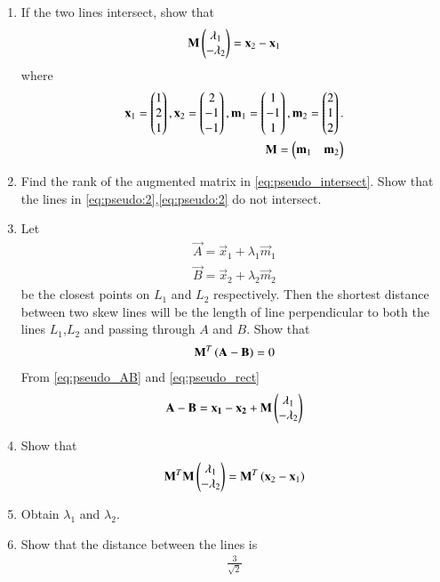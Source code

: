 \documentclass[journal,12pt,twocolumn]{IEEEtran}
\renewcommand\thesection{\arabic{section}}
\begin{document}
\begin{enumerate}[label=\thesection.\arabic*.,ref=\thesection.\theenumi]

\item If the two lines intersect, show that 
\begin{align}
\mathbf{M}\begin{pmatrix}\lambda_1 \\ -\lambda_2\end{pmatrix} = \mathbf{x}_2 - \mathbf{x}_1
\label{eq:pseudo_intersect}
\end{align}
%
where 
\begin{align}
\label{eq:pseudo_xm}
\mathbf{x}_1 = \begin{pmatrix}1\\2\\1\end{pmatrix},
\mathbf{x}_2 = \begin{pmatrix}2\\-1\\-1\end{pmatrix},
\mathbf{m}_1 = \begin{pmatrix}1\\-1\\1\end{pmatrix},
\mathbf{m}_2 = \begin{pmatrix}2\\1\\2\end{pmatrix}.
\\
\mathbf{M} =\begin{pmatrix}\mathbf{m}_1 & \mathbf{m}_2\end{pmatrix}
\label{eq:pseudo_rect}
\end{align}
\item Find the rank of the augmented matrix in 
\eqref{eq:pseudo_intersect}.
	Show that  the lines in \eqref{eq:pseudo:2},\eqref{eq:pseudo:2}
 do not intersect.
\item Let 
\begin{align}
\vec{A}=\vec{x}_1 + \lambda_1 \vec{m}_1
\\
\vec{B}=\vec{x}_2 + \lambda_2 \vec{m}_2
\label{eq:pseudo_AB}
\end{align}
be the closest points on $L_1$ and $L_2$ respectively.  Then the shortest distance between two skew lines 
will be the length of line perpendicular to both the lines $L_1$,$L_2$ and passing through $A$ and $B$.
Show that 
\begin{align}
\mathbf{M}^T\left(\mathbf{A}-\mathbf{B}\right) = 0
\label{eq:pseudo:MAB}
\end{align}
From \eqref{eq:pseudo_AB} and \eqref{eq:pseudo_rect}
%
\begin{align}
    \mathbf{A-B}=\mathbf{x_1-x_2}+\mathbf{M}\begin{pmatrix}\lambda_1\\ -\lambda_2\end{pmatrix}
\label{eq:pseudo:31}
\end{align}
\item Show that
\begin{align}
    \mathbf{M}^T\mathbf{M}\begin{pmatrix}\lambda_1\\-\lambda_2\end{pmatrix} = \mathbf{M}^T\left(\mathbf{x}_2-\mathbf{x}_1\right)
\label{eq:pseudo_ls}
\end{align}
\item Obtain $\lambda_1$ and $\lambda_2$.
%
\item Show that the distance between the lines is 
\begin{align}
    \frac{3}{\sqrt{2}}
\end{align}


\end{enumerate}
\end{document}
